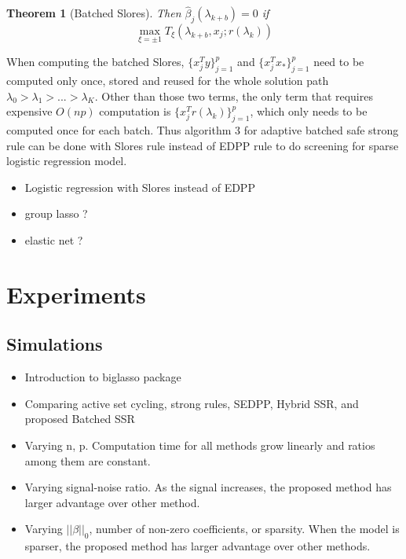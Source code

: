 \documentclass{article}
\newtheorem{theorem}{Theorem}[section]
\begin{document}
\begin{theorem}[Batched Slores]
Then $\hat{\beta}_j(\lambda_{k+b})=0$ if
        \begin{equation}
            \max_{\xi=\pm1} T_\xi(\lambda_{k+b},x_j;r(\lambda_k))
        \end{equation}
\end{theorem}

When computing the batched Slores, $\{x_j^Ty\}_{j=1}^p$ and $\{x_j^Tx_*\}_{j=1}^p$ need to be computed only once, stored and reused for the whole solution path $\lambda_0>\lambda_1>...>\lambda_K$. Other than those two terms, the only term that requires expensive $O(np)$ computation is $\{x_j^Tr(\lambda_k)\}_{j=1}^p$, which only needs to be computed once for each batch. Thus algorithm 3 for adaptive batched safe strong rule can be done with Slores rule instead of EDPP rule to do screening for sparse logistic regression model.


\begin{itemize}
    \item Logistic regression with Slores instead of EDPP
    \item group lasso ?
    \item elastic net ?
\end{itemize}

\section{Experiments}
\label{sec:5}

\subsection{Simulations}
\label{sec:sim}
\begin{itemize}
    \item Introduction to biglasso package
\end{itemize}
\begin{itemize}
    \item Comparing active set cycling, strong rules, SEDPP, Hybrid SSR, and proposed Batched SSR
    \item Varying n, p. Computation time for all methods grow linearly and ratios among them are constant.
    \item Varying signal-noise ratio. As the signal increases, the proposed method has larger advantage over other method.
    \item Varying $||\beta||_0$, number of non-zero coefficients, or sparsity. When the model is sparser, the proposed method has larger advantage over other methods.
\end{itemize}
\end{document}
